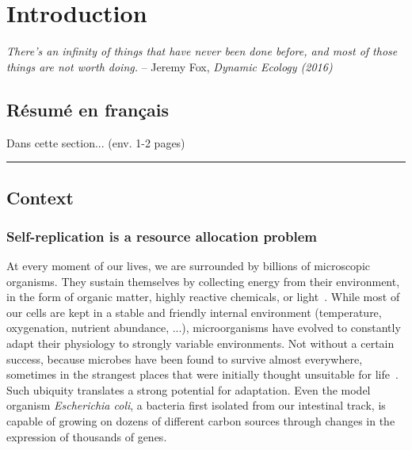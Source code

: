 \chapter{Introduction}

\textit{There's an infinity of things that have never been done before, and most of those things are not worth doing.} -- Jeremy Fox, \textit{Dynamic Ecology (2016)}~\cite{fox_how_2016}

\section*{Résumé en français}

Dans cette section... (env. 1-2 pages)

\begin{center}
\noindent\rule{4cm}{0.1pt}
\end{center}

\section{Context}
\label{sec:context}

\subsection{Self-replication is a resource allocation problem}

At every moment of our lives, we are surrounded by billions of microscopic organisms.
They sustain themselves by collecting energy from their environment, in the form of organic matter, highly reactive chemicals, or light~\cite{madigan_biology_2006,schaechter_microbe_2006}.
While most of our cells are kept in a stable and friendly internal environment (temperature, oxygenation, nutrient abundance, ...), microorganisms have evolved to constantly adapt their physiology to strongly variable environments.
Not without a certain success, because microbes have been found to survive almost everywhere, sometimes in the strangest places that were initially thought unsuitable for life~\cite{rothschild_life_2001,nicholson_transcriptomic_2012,madigan_biology_2006,schaechter_microbe_2006}.
Such ubiquity translates a strong potential for adaptation.
Even the model organism \textit{Escherichia coli}, a bacteria first isolated from our intestinal track, is capable of growing on dozens of different carbon sources through changes in the expression of thousands of genes\cite{zimmer_microcosm:_2009}.

